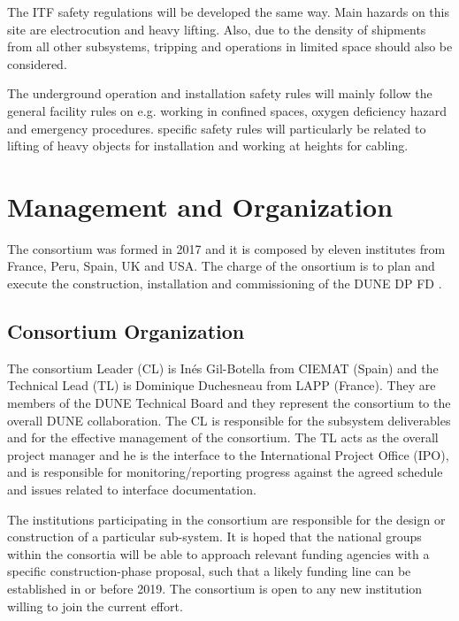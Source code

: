 The ITF \dual {} safety regulations will be developed the same way. Main hazards on this site are electrocution and heavy lifting. Also, due to the density of shipments from all other subsystems, tripping and operations in limited space should also be considered.

The underground operation and installation safety rules will mainly follow the general facility rules on e.g. working in confined spaces, oxygen deficiency hazard and emergency procedures. \dual {} specific safety rules will particularly be related to lifting of heavy objects for installation and working at heights for cabling.

\section{Management and Organization}
\label{sec:fddp-pd-12}

The \dual {} consortium was formed in 2017 and it is composed by eleven institutes from France, Peru, Spain, UK and USA. The charge of the \dual {} onsortium is to plan and execute the construction, installation and commissioning of the DUNE DP FD .


\subsection{Consortium Organization}
\label{sec:fddp-pd-12.1}

The \dual {} consortium Leader (CL) is In\'{e}s Gil-Botella from CIEMAT (Spain) and the Technical Lead (TL) is Dominique Duchesneau from LAPP (France). They are members of the DUNE Technical Board and they represent the consortium to the overall DUNE collaboration. The CL is responsible for the subsystem deliverables and for the effective management of the consortium. The TL acts as the overall project manager and he is the interface to the International Project Office (IPO), and is responsible for monitoring/reporting progress against the agreed schedule and issues related to interface documentation.

The institutions participating in the consortium are responsible for the design or construction of a particular sub-system. It is hoped that the national groups within the consortia will be able to approach relevant funding agencies with a specific construction-phase proposal, such that a likely funding line can be established in or before 2019. The \dual {} consortium is open to any new institution willing to join the current effort.


